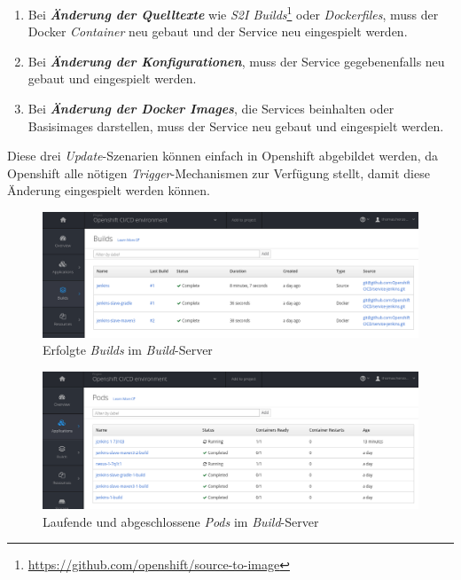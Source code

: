 \begin{enumerate}
	\item Bei \textbf{\emph{Änderung der Quelltexte}} wie \emph{S2I Builds}\footnote{\url{https://github.com/openshift/source-to-image}} oder \emph{Dockerfiles}, muss der Docker \emph{Container} neu gebaut und der Service neu eingespielt werden.
	\item Bei \textbf{\emph{Änderung der Konfigurationen}}, muss der Service gegebenenfalls neu gebaut und eingespielt werden.
	\item Bei \textbf{\emph{Änderung der Docker Images}}, die Services beinhalten oder Basisimages darstellen, muss der Service neu gebaut und eingespielt werden.
\end{enumerate}
Diese drei \emph{Update}-Szenarien können einfach in Openshift abgebildet werden, da Openshift alle nötigen \emph{Trigger}-Mechanismen zur Verfügung stellt, damit diese Änderung eingespielt werden können. 

\begin{figure}[H]
	\centering
	\includegraphics[scale=0.55]{image/buildserver-builds.png}
	\caption{Erfolgte \emph{Builds} im \emph{Build}-Server}
	\label{fig:appserver}
\end{figure}

\begin{figure}[H]
	\centering
	\includegraphics[scale=0.55]{image/buildserver-pods.png}
	\caption{Laufende und abgeschlossene \emph{Pods} im \emph{Build}-Server}
	\label{fig:appserver}
\end{figure}

\pagebreak

